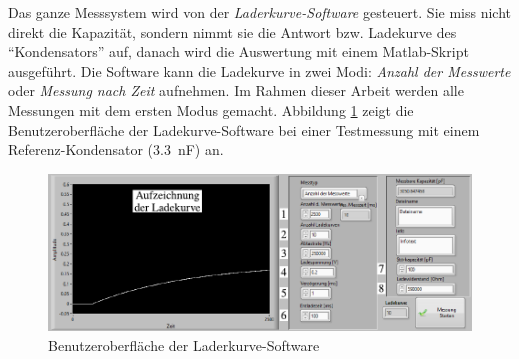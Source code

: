 Das ganze Messsystem wird von der \textit{Laderkurve-Software} gesteuert.
Sie miss nicht direkt die Kapazität, sondern nimmt sie die Antwort bzw. Ladekurve des ``Kondensators'' auf, danach wird die Auswertung mit einem Matlab-Skript ausgeführt.
Die Software kann die Ladekurve in zwei Modi: \emph{Anzahl der Messwerte} oder \emph{Messung nach Zeit} aufnehmen.
Im Rahmen dieser Arbeit werden alle Messungen mit dem ersten Modus gemacht.
Abbildung \ref{fig:gui_der_laderkurve_software} zeigt die Benutzeroberfläche der Ladekurve-Software bei einer Testmessung mit einem Referenz-Kondensator (\SI{3.3}{\nano\farad}) an.
\begin{figure}[htb]
    \centering
    \includegraphics[]{./images/ladekurven_gui.pdf}
    \caption{Benutzeroberfläche der Laderkurve-Software}
    \label{fig:gui_der_laderkurve_software}
\end{figure}

